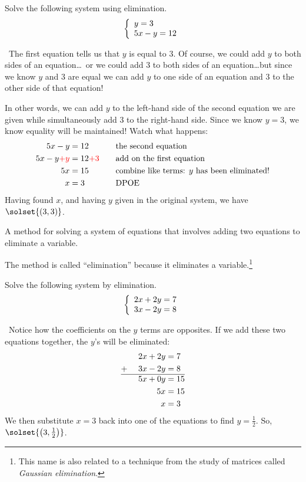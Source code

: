 \begin{boxedex}
Solve the following system using elimination. \[\left\{\begin{array}{l}y=3\\5x-y=12\end{array}\right.\]

\exsoln\ The first equation tells us that $y$ is equal to 3. Of course, we could add $y$ to both sides of an equation\ldots\ or we could add 3 to both sides of an equation\ldots but since we know $y$ and 3 are equal we can add $y$ to one side of an equation and 3 to the other side of that equation!

In other words, we can add $y$ to the left-hand side of the second equation we are given while simultaneously add $3$ to the right-hand side. Since we know $y=3$, we know equality will be maintained! Watch what happens:
\[
\begin{aligned}
5x-y &= 12
&&\quad\text{the second equation}\\
5x-y {\color{red}+y} &=12{\color{red}+3}
&&\quad\text{add on the first equation}\\
5x &=15
&&\quad\text{combine like terms: $y$ has been eliminated!}\\
x &=3
&&\quad\text{DPOE}
\end{aligned}
\]
Having found $x$, and having $y$ given in the original system, we have $\solset{(3,3)}$.
\end{boxedex}

\begin{boxeddef}
A method for solving a system of equations that involves adding two equations to eliminate a variable.
\end{boxeddef}

The method is called ``elimination'' because it eliminates a variable.\footnote{This name is also related to a technique from the study of matrices called \textit{Gaussian elimination}.}

\begin{boxedex}
Solve the following system by elimination. \[\left\{\begin{array}{l}2x + 2y = 7\\3x - 2y = 8\end{array}\right.\]

\exsoln\ Notice how the coefficients on the $y$ terms are opposites. If we add these two equations together, the $y$'s will be eliminated:
\[
\begin{aligned}
		&&2x + 2y	&= 7\\
+~		&&3x - 2y	&= 8\\\hline
		&&5x +0y	&= 15\\
		&&5x 		&= 15\\
		&&x 		&= 3
\end{aligned}
\]
We then substitute $x=3$ back into one of the equations to find $y = \frac{1}{2}$. So, $\solset{\left(3,\frac{1}{2}\right)}$.
\end{boxedex}

